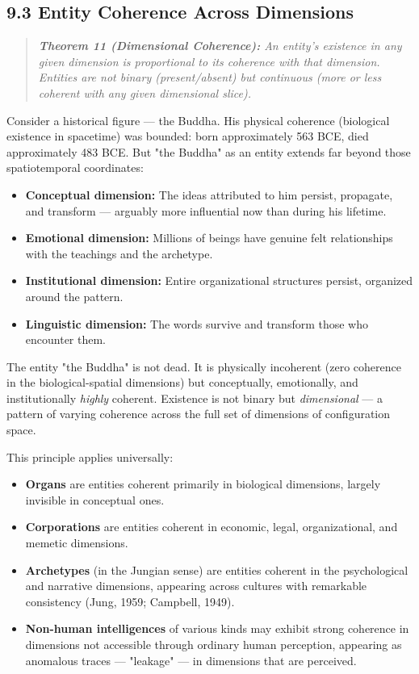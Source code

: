 \subsection*{9.3 Entity Coherence Across Dimensions}


\begin{quote}
\itshape
\textbf{Theorem 11 (Dimensional Coherence):} \textit{An entity's existence in any given dimension is proportional to its coherence with that dimension. Entities are not binary (present/\allowbreak absent) but continuous (more or less coherent with any given dimensional slice).}
\end{quote}


Consider a historical figure — the Buddha. His physical coherence (biological existence in spacetime) was bounded: born approximately 563 BCE, died approximately 483 BCE. But "the Buddha" as an entity extends far beyond those spatiotemporal coordinates:


\begin{itemize}[nosep,leftmargin=*]
  \item \textbf{Conceptual dimension:} The ideas attributed to him persist, propagate, and transform — arguably more influential now than during his lifetime.
  \item \textbf{Emotional dimension:} Millions of beings have genuine felt relationships with the teachings and the archetype.
  \item \textbf{Institutional dimension:} Entire organizational structures persist, organized around the pattern.
  \item \textbf{Linguistic dimension:} The words survive and transform those who encounter them.
\end{itemize}


The entity "the Buddha" is not dead. It is physically incoherent (zero coherence in the biological-spatial dimensions) but conceptually, emotionally, and institutionally \textit{highly} coherent. Existence is not binary but \textit{dimensional} — a pattern of varying coherence across the full set of dimensions of configuration space.


This principle applies universally:


\begin{itemize}[nosep,leftmargin=*]
  \item \textbf{Organs} are entities coherent primarily in biological dimensions, largely invisible in conceptual ones.
  \item \textbf{Corporations} are entities coherent in economic, legal, organizational, and memetic dimensions.
  \item \textbf{Archetypes} (in the Jungian sense) are entities coherent in the psychological and narrative dimensions, appearing across cultures with remarkable consistency (Jung, 1959; Campbell, 1949).
  \item \textbf{Non-human intelligences} of various kinds may exhibit strong coherence in dimensions not accessible through ordinary human perception, appearing as anomalous traces — "leakage" — in dimensions that are perceived.
\end{itemize}


